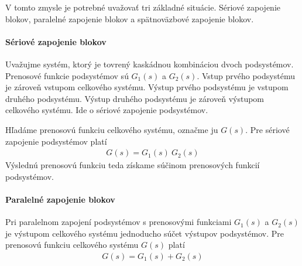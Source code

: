 \documentclass[a4paper, 10pt, ]{article}
\begin{document}
V tomto zmysle je potrebné uvažovať tri základné situácie. Sériové zapojenie blokov, paralelné zapojenie blokov a spätnoväzbové zapojenie blokov.

\paragraph{Sériové zapojenie blokov}

Uvažujme systém, ktorý je tovrený kaskádnou kombináciou dvoch podsystémov. Prenosové funkcie podsystémov sú $G_1(s)$ a $G_2(s)$. Vstup prvého podsystému je zároveň vstupom celkového systému. Výstup prvého podsystému je vstupom druhého podsystému. Výstup druhého podsystému je zároveň výstupom celkového systému. Ide o sériové zapojenie podsystémov.

\begin{center}

    \makebox[\textwidth][c]{%
    
    }

	\label{TFalgebra_seriove}

\end{center}

Hľadáme prenosovú funkciu celkového systému, označme ju $G(s)$. Pre sériové zapojenie podsystémov platí
\begin{align}
    G(s) = G_1(s)\ G_2(s)
\end{align}
Výslednú prenosovú funkciu teda získame súčinom prenosových funkcií podsystémov.




\paragraph{Paralelné zapojenie blokov}

\begin{center}

    \makebox[\textwidth][c]{%
    
    }

	\label{TFalgebra_paralelne}

\end{center}

Pri paralelnom zapojení podsystémov s prenosovými funkciami $G_1(s)$ a $G_2(s)$ je výstupom celkového systému jednoducho súčet výstupov podsystémov. Pre prenosovú funkciu celkového systému $G(s)$ platí
\begin{align}
    G(s) = G_1(s) + G_2(s)
\end{align}
\end{document}
